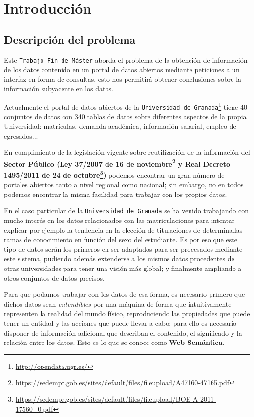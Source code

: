 \chapter{Introducción}

\section{Descripción del problema}

Este {\tt Trabajo Fin de Máster} aborda el problema de la obtención de información de los datos contenido en un portal de datos abiertos mediante peticiones a un interfaz en forma de consultas, esto nos permitirá obtener conclusiones sobre la información subyacente en los datos.

\bigskip
Actualmente el portal de datos abiertos de la {\tt Universidad de Granada}\footnote{\url{http://opendata.ugr.es/}} tiene 40 conjuntos de datos con 340 tablas de datos sobre diferentes aspectos de la propia Universidad: matrículas, demanda académica, información salarial, empleo de egresados...

\bigskip
En cumplimiento de la legislación vigente sobre reutilización de la información del \textbf{Sector Público (Ley 37/2007 de 16 de noviembre\footnote{\url{https://sedempr.gob.es/sites/default/files/fileupload/A47160-47165.pdf}} y Real Decreto 1495/2011 de 24 de octubre\footnote{\url{https://sedempr.gob.es/sites/default/files/fileupload/BOE-A-2011-17560\_0.pdf}})} podemos encontrar un gran número de portales abiertos tanto a nivel regional como nacional; sin embargo, no en todos podemos encontrar la misma facilidad para trabajar con los propios datos.

\bigskip
En el caso particular de la {\tt Universidad de Granada} se ha venido trabajando con mucho interés en los datos relacionados con las matriculaciones para intentar explicar por ejemplo la tendencia en la elección de titulaciones de determinadas ramas de conocimiento en función del sexo del estudiante. Es por eso que este tipo de datos serán los primeros en ser adaptados para ser procesados mediante este sistema, pudiendo además extenderse a los mismos datos procedentes de otras universidades para tener una visión más global; y finalmente ampliando a otros conjuntos de datos precisos. 

\newpage
Para que podamos trabajar con los datos de esa forma, es necesario primero que dichos datos sean \textit{entendibles} por una máquina de forma que intuitivamente representen la realidad del mundo físico, reproduciendo las propiedades que puede tener un entidad y las acciones que puede llevar a cabo; para ello es necesario disponer de información adicional que describan el contenido, el significado y la relación entre los datos. Esto es lo que se conoce como \textbf{Web Semántica}.

